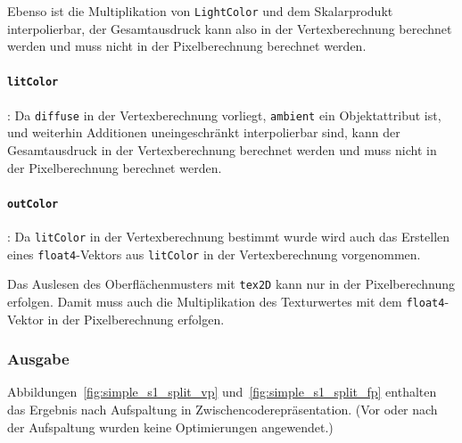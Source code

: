 \documentclass[twoside,a4paper,fleqn,12pt]{book}
\begin{document}
Ebenso ist die Multiplikation von \texttt{LightColor} und dem Skalarprodukt interpolierbar, der Gesamtausdruck kann also
in der Vertexberechnung berechnet werden und muss nicht in der Pixelberechnung berechnet werden.

\paragraph{\texttt{litColor}}: Da \texttt{diffuse} in der Vertexberechnung vorliegt, \texttt{ambient} ein Objektattribut ist, und weiterhin
Additionen uneingeschränkt interpolierbar sind, kann der Gesamtausdruck in der Vertexberechnung berechnet werden und muss nicht in der Pixelberechnung berechnet werden.

\paragraph{\texttt{outColor}}: Da \texttt{litColor} in der Vertexberechnung bestimmt wurde wird
auch das Erstellen eines \texttt{float4}-Vektors aus \texttt{litColor} in der Vertexberechnung vorgenommen.

Das Auslesen des Oberflächenmusters mit \texttt{tex2D} kann nur in der Pixelberechnung erfolgen. Damit muss auch die Multiplikation des Texturwertes mit
dem \texttt{float4}-Vektor in der Pixelberechnung erfolgen.

\subsubsection{Ausgabe}

Abbildungen~\ref{fig:simple_s1_split_vp} und~\ref{fig:simple_s1_split_fp} enthalten das Ergebnis nach Aufspaltung in Zwischencoderepräsentation.
(Vor oder nach der Aufspaltung wurden keine Optimierungen angewendet.)
\end{document}
